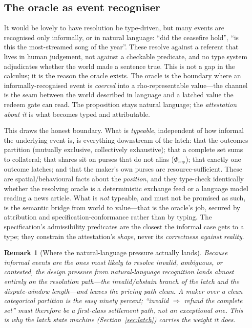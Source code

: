 \documentclass[11pt]{article}
\newtheorem{remark}{Remark}[section]
\begin{document}
\subsection{The oracle as event recogniser}\label{sec:oracle-recogniser}

It would be lovely to have resolution be type-driven, but many events are recognised only
informally, or in natural language: ``did the ceasefire hold'', ``is this the most-streamed
song of the year''. These resolve against a referent that lives in human judgement, not
against a checkable predicate, and no type system adjudicates whether the world made a
sentence true. This is not a gap in the calculus; it is the reason the oracle exists. The
oracle is the boundary where an informally-recognised event is \emph{coerced} into a
rho-representable value---the channel is the seam between the world described in language and a
latched value the redeem gate can read. The proposition stays natural language; the
\emph{attestation about it} is what becomes typed and attributable.

This draws the honest boundary. What is \emph{typeable}, independent of how informal the
underlying event is, is everything downstream of the latch: that the outcomes partition
(mutually exclusive, collectively exhaustive); that a complete set sums to collateral; that
shares sit on purses that do not alias ($\Phi_{\mathrm{sep}}$); that exactly one outcome
latches; and that the maker's own purses are resource-sufficient. These are spatial/behavioural
facts about the \emph{position}, and they type-check identically whether the resolving oracle
is a deterministic exchange feed or a language model reading a news article. What is
\emph{not} typeable, and must not be promised as such, is the semantic bridge from world to
value---that is the oracle's job, secured by attribution and specification-conformance rather
than by typing. The specification's admissibility predicates are the closest the informal case
gets to a type; they constrain the attestation's \emph{shape}, never its \emph{correctness
against reality}.

\begin{remark}[Where the natural-language pressure actually lands]
Because informal events are the ones most likely to resolve invalid, ambiguous, or contested,
the design pressure from natural-language recognition lands almost entirely on the
\emph{resolution path}---the invalid/abstain branch of the latch and the dispute-window
length---and leaves the \emph{pricing path} clean. A maker over a clean categorical partition
is the easy ninety percent; ``invalid $\Rightarrow$ refund the complete set'' must therefore
be a first-class settlement path, not an exceptional one. This is why the latch state machine
(Section~\ref{sec:latch}) carries the weight it does.
\end{remark}
\end{document}
